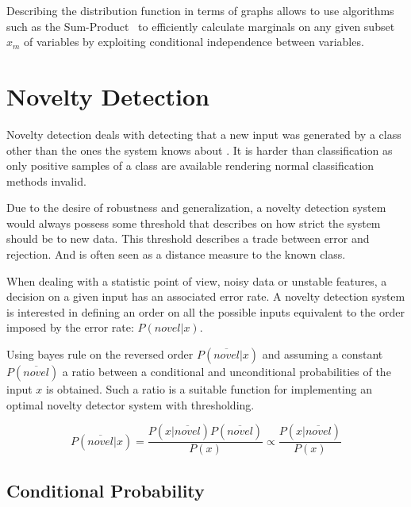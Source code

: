 \documentclass[runningheads,a4paper]{llncs}
\begin{document}
Describing the distribution function in terms of graphs allows to use algorithms
such as the Sum-Product~\citep{kschischang2001factor} to efficiently calculate
marginals on any given subset $x_m$ of variables by exploiting conditional
independence between variables.

\section{Novelty Detection}
Novelty detection deals with detecting that a new input was generated by a class
other than the ones the system knows about \citep{markou2003novelty}.
It is harder than classification as only positive samples of a class are available
rendering normal classification methods invalid.

Due to the desire of robustness and generalization, a novelty detection system would
always possess some threshold that describes on how strict the system should be to
new data.
This threshold describes a trade between error and rejection.
And is often seen as a distance measure to the known class.

When dealing with a statistic point of view, noisy data or unstable features, a decision on a
given input has an associated error rate. A novelty detection system is interested in defining an
order on all the possible inputs equivalent to the order imposed by the error rate: $P(novel|x)$.

Using bayes rule on the reversed order $P(\overline{novel}|x)$ and assuming a constant $P(\overline{novel})$
a ratio between a conditional and unconditional probabilities of the input $x$ is obtained.
Such a ratio is a suitable function for implementing an optimal novelty detector system with
thresholding.

\begin{equation}
\label{eq:novelty-threshold}
          P(\overline{novel}|x)
  =       \frac{P(x|\overline{novel}) P(\overline{novel})}{P(x)}
  \propto \frac{P(x|\overline{novel})}{P(x)}
\end{equation}

\subsection{Conditional Probability}
\label{sec:conditional-prob}
\end{document}
